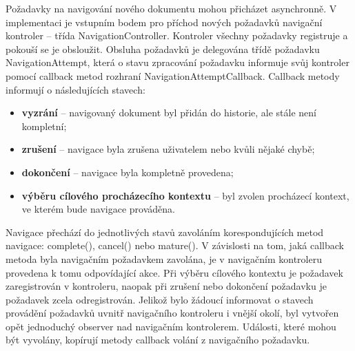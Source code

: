 Požadavky na navigování nového dokumentu mohou přicházet asynchronně. V implementaci je vstupním bodem pro příchod nových požadavků navigační kontroler -- třída NavigationController. Kontroler všechny požadavky registruje a pokouší se je obsloužit. Obsluha požadavků je delegována třídě požadavku NavigationAttempt, která o stavu zpracování požadavku informuje svůj kontroler pomocí callback metod rozhraní NavigationAttemptCallback. Callback metody informují o následujících stavech:

\begin{itemize}
  \item \textbf{vyzrání} -- navigovaný dokument byl přidán do historie, ale stále není kompletní;
  \item \textbf{zrušení} -- navigace byla zrušena uživatelem nebo kvůli nějaké chybě;
  \item \textbf{dokončení} -- navigace byla kompletně provedena; 
  \item \textbf{výběru cílového procházecího kontextu} -- byl zvolen procházecí kontext, ve kterém bude navigace prováděna.
\end{itemize}

Navigace přechází do jednotlivých stavů zavoláním korespondujících metod navigace: complete(), cancel() nebo mature(). V závislosti na tom, jaká callback metoda byla navigačním požadavkem zavolána, je v navigačním kontroleru provedena k tomu odpovídající akce. Při výběru cílového kontextu je požadavek zaregistrován v kontroleru, naopak při zrušení nebo dokončení požadavku je požadavek zcela odregistrován. Jelikož bylo žádoucí informovat o stavech provádění požadavků uvnitř navigačního kontroleru i vnější okolí, byl vytvořen opět jednoduchý observer nad navigačním kontrolerem. Události, které mohou být vyvolány, kopírují metody callback volání z navigačního požadavku. 

